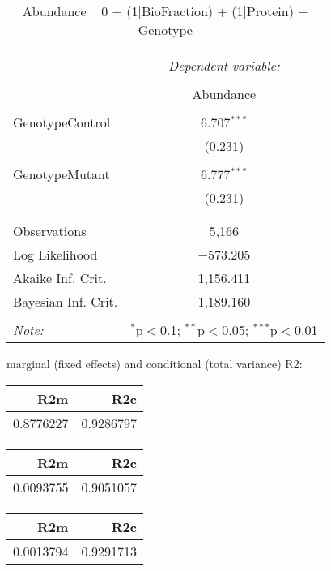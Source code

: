 \documentclass[11pt]{report}
\begin{document}
\begin{table}[!htbp] \centering 
  \caption{Abundance ~ 0 + (1|BioFraction) + (1|Protein) + Genotype} 
  \label{} 
\begin{tabular}{@{\extracolsep{5pt}}lc} 
\\[-1.8ex]\hline 
\hline \\[-1.8ex] 
 & \multicolumn{1}{c}{\textit{Dependent variable:}} \\ 
\cline{2-2} 
\\[-1.8ex] & Abundance \\ 
\hline \\[-1.8ex] 
 GenotypeControl & 6.707$^{***}$ \\ 
  & (0.231) \\ 
  & \\ 
 GenotypeMutant & 6.777$^{***}$ \\ 
  & (0.231) \\ 
  & \\ 
\hline \\[-1.8ex] 
Observations & 5,166 \\ 
Log Likelihood & $-$573.205 \\ 
Akaike Inf. Crit. & 1,156.411 \\ 
Bayesian Inf. Crit. & 1,189.160 \\ 
\hline 
\hline \\[-1.8ex] 
\textit{Note:}  & \multicolumn{1}{r}{$^{*}$p$<$0.1; $^{**}$p$<$0.05; $^{***}$p$<$0.01} \\ 
\end{tabular} 
\end{table} 
marginal (fixed effects) and conditional (total variance) R2:

\begin{tabular}{r|r}
\hline
R2m & R2c\\
\hline
0.8776227 & 0.9286797\\
\hline
\end{tabular}

\begin{tabular}{r|r}
\hline
R2m & R2c\\
\hline
0.0093755 & 0.9051057\\
\hline
\end{tabular}

\begin{tabular}{r|r}
\hline
R2m & R2c\\
\hline
0.0013794 & 0.9291713\\
\hline
\end{tabular}
\end{document}
